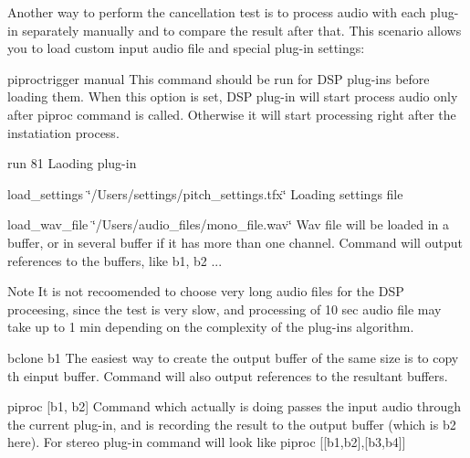 Another way to perform the cancellation test is to process audio with each plug-\/in separately manually and to compare the result after that. This scenario allows you to load custom input audio file and special plug-\/in settings\+: 
\begin{DoxyEnumerate}
\item {\ttfamily piproctrigger manual} This command should be run for D\+S\+P plug-\/ins before loading them. When this option is set, D\+S\+P plug-\/in will start process audio only after piproc command is called. Otherwise it will start processing right after the instatiation process. ~\newline
  
\item {\ttfamily run 81} Laoding plug-\/in ~\newline
  
\item {\ttfamily load\+\_\+settings \char`\"{}/\+Users/settings/pitch\+\_\+settings.\+tfx\char`\"{}} Loading settings file ~\newline
  
\item {\ttfamily load\+\_\+wav\+\_\+file \char`\"{}/\+Users/audio\+\_\+files/mono\+\_\+file.\+wav\char`\"{}} Wav file will be loaded in a buffer, or in several buffer if it has more than one channel. Command will output references to the buffers, like b1, b2 ... \begin{DoxyNote}{Note}
It is not recoomended to choose very long audio files for the D\+S\+P proceesing, since the test is very slow, and processing of 10 sec audio file may take up to 1 min depending on the complexity of the plug-\/in\textquotesingle{}s algorithm. ~\newline
  
\end{DoxyNote}

\item {\ttfamily bclone b1} The easiest way to create the output buffer of the same size is to copy th einput buffer. Command will also output references to the resultant buffers. ~\newline
  
\item {\ttfamily piproc \mbox{[}b1, b2\mbox{]}} Command which actually is doing passes the input audio through the current plug-\/in, and is recording the result to the output buffer (which is b2 here). For stereo plug-\/in command will look like piproc {\ttfamily \mbox{[}\mbox{[}b1,b2\mbox{]},\mbox{[}b3,b4\mbox{]}\mbox{]}} ~\newline
  

\end{DoxyEnumerate}
